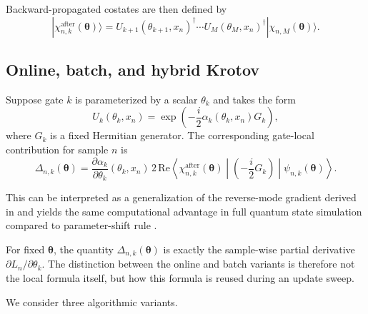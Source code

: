 \documentclass[aps,prb,10pt,twocolumn,superscriptaddress]{revtex4-2}
\begin{document}
Backward-propagated costates are then defined by
\begin{equation}
|\chi_{n,k}^{\mathrm{after}}(\bm{\theta})\rangle
=
U_{k+1}(\theta_{k+1},x_n)^\dagger \cdots U_M(\theta_M,x_n)^\dagger
|\chi_{n,M}(\bm{\theta})\rangle.
\label{eq:backward_costates}
\end{equation}

\subsection{Online, batch, and hybrid Krotov}

Suppose gate \(k\) is parameterized by a scalar \(\theta_k\) and takes the form
\begin{equation}
U_k(\theta_k,x_n)=\exp\!\left(-\frac{i}{2}\alpha_k(\theta_k,x_n)G_k\right),
\label{eq:fixed_generator_gate}
\end{equation}
where \(G_k\) is a fixed Hermitian generator. The corresponding gate-local contribution for sample \(n\) is
\begin{equation}
\Delta_{n,k}(\bm{\theta})
=
\frac{\partial \alpha_k}{\partial \theta_k}(\theta_k,x_n)\,
2\,\mathrm{Re}\!\left\langle
\chi_{n,k}^{\mathrm{after}}(\bm{\theta})
\middle|
\left(-\frac{i}{2}G_k\right)
\middle|
\psi_{n,k}(\bm{\theta})
\right\rangle.
\label{eq:discrete_contribution}
\end{equation}

This can be interpreted as a generalization of the reverse-mode gradient derived in \cite{jones2020efficientcalculationgradientsclassical} and yields the same computational advantage in full quantum state simulation compared to parameter-shift rule .

For fixed \(\bm{\theta}\), the quantity \(\Delta_{n,k}(\bm{\theta})\) is exactly the sample-wise partial derivative \(\partial L_n/\partial \theta_k\). The distinction between the online and batch variants is therefore not the local formula itself, but how this formula is reused during an update sweep.

We consider three algorithmic variants.
\end{document}
